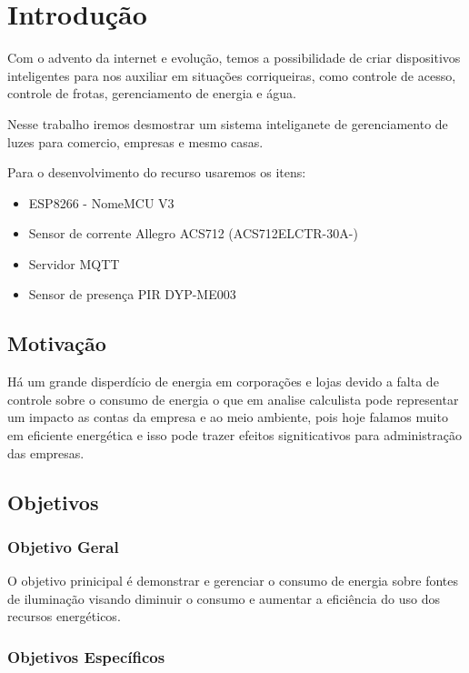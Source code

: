 \documentclass[openright]{normas-utf-tex} %
\begin{document}
\chapter{Introdução}


Com o advento da internet e evolução, temos a possibilidade de criar dispositivos inteligentes \cite{Novatec} para nos auxiliar em situações corriqueiras, como controle de acesso, controle de frotas, gerenciamento de energia e água.

Nesse trabalho iremos desmostrar um sistema inteliganete de gerenciamento de luzes para comercio, empresas e mesmo casas.

Para o desenvolvimento do recurso usaremos os itens:

\begin{itemize}
       	\item ESP8266 - NomeMCU V3
        \item Sensor de corrente Allegro ACS712 (ACS712ELCTR-30A-)
        \item Servidor MQTT
        \item Sensor de presença PIR DYP-ME003
\end{itemize}
\section{Motivação}

Há um grande disperdício de energia em corporações e lojas devido  a falta de controle sobre o consumo de energia o que em analise calculista pode representar um impacto as contas da empresa e ao meio ambiente, pois hoje falamos muito em eficiente energética e isso pode trazer efeitos signiticativos para administração das empresas.

\section{Objetivos}

\subsection{Objetivo Geral}

O objetivo prinicipal é demonstrar e gerenciar o consumo de energia sobre fontes de iluminação visando diminuir o consumo e aumentar a eficiência do uso dos recursos energéticos. 

\subsection{Objetivos Específicos}
\end{document}
